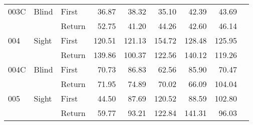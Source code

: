 \begin{table}[!htb]
\begin{tabular}{lllrrrrrr}
003C & Blind & First &   36.87 &   38.32 &                                                 35.10 &                                                  42.39 &   43.69 \\
    &       & Return &   52.75 &   41.20 &                                                 44.26 &                                                  42.60 &   46.14 \\
004 & Sight & First &  120.51 &  121.13 &                                                154.72 &                                                 128.48 &  125.95 \\
    &       & Return &  139.86 &  100.37 &                                                122.56 &                                                 140.12 &  119.26 \\
004C & Blind & First &   70.73 &   86.83 &                                                 62.56 &                                                  85.90 &   70.47 \\
    &       & Return &   71.95 &   74.89 &                                                 70.02 &                                                  66.09 &  104.04 \\
005 & Sight & First &   44.50 &   87.69 &                                                120.52 &                                                  88.59 &  102.80 \\
    &       & Return &   59.77 &   93.21 &                                                122.84 &                                                 141.31 &   96.03 \\
\bottomrule
\end{tabular}
\end{table}

